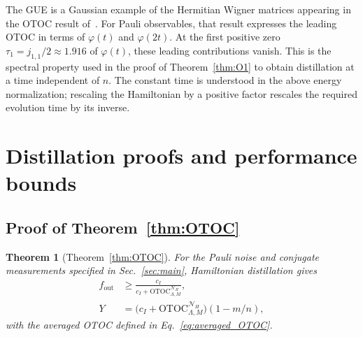 \documentclass[onecolumn,prx,longbibliography,nofootinbib, superscriptaddress]{revtex4-2}
\theoremstyle{recap}
\newtheorem*{thmrecap}{Theorem}
\begin{document}
The GUE is a Gaussian example of the Hermitian Wigner matrices appearing in the OTOC result of~\cite{cipolloni2024outoftimeorderedcorrelatorswignermatrices}. For Pauli observables, that result expresses the leading OTOC in terms of $\varphi(t)$ and $\varphi(2t)$. At the first positive zero $\tau_1=j_{1,1}/2\approx 1.916$ of $\varphi(t)$, these leading contributions vanish. This is the spectral property used in the proof of Theorem~\ref{thm:O1} to obtain distillation at a time independent of $n$. The constant time is understood in the above energy normalization; rescaling the Hamiltonian by a positive factor rescales the required evolution time by its inverse.

\section{Distillation proofs and performance bounds}\label{appendix:proofs}
\subsection{Proof of Theorem~\ref{thm:OTOC}}\label{appendix:OTOC}

\begin{thmrecap}[Theorem~\ref{thm:OTOC}]
    For the Pauli noise and conjugate measurements specified in Sec.~\ref{sec:main}, Hamiltonian distillation gives
    \begin{equation}
    \begin{split}
        f_{\mathrm{out}}&\geq\frac{c_I}{c_I+\mathrm{OTOC}_{\Lambda,M}^{\mathcal{N}_H}},\\
        Y&=\bigl(c_I+\mathrm{OTOC}_{\Lambda,M}^{\mathcal{N}_H}\bigr)(1-m/n),
    \end{split}
    \end{equation}
    with the averaged OTOC defined in Eq.~\eqref{eq:averaged_OTOC}.
\end{thmrecap}
\end{document}
